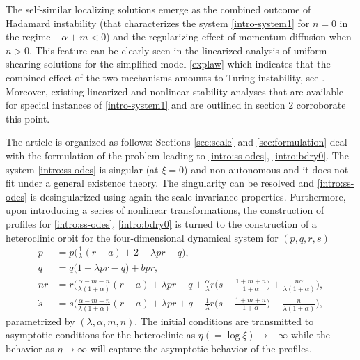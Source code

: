\documentclass[usletter,11pt]{article}
\theoremstyle{remark}
\begin{document}
The self-similar localizing solutions emerge as the combined outcome of Hadamard instability (that characterizes the system \eqref{intro-system1} for $n=0$ in the regime
$-\alpha + m < 0$) and the regularizing effect of momentum diffusion when $n > 0$.
This feature can be clearly seen in the linearized analysis of uniform shearing solutions for the simplified model \eqref{explaw} which indicates that the
combined effect of the two mechanisms amounts to Turing instability, see \cite{KOT14}. Moreover, existing linearized and nonlinear stability analyses that are available 
for special instances of \eqref{intro-system1} and are outlined in section 2 corroborate this point.  


The article is organized as follows: 
Sections \ref{sec:scale} and  \ref{sec:formulation} deal with the formulation of the problem leading to \eqref{intro:ss-odes}, \eqref{intro:bdry0}.
The system \eqref{intro:ss-odes} is singular (at $\xi=0$) and non-autonomous and it does not fit under a general existence theory.
The singularity can be resolved and \eqref{intro:ss-odes} is desingularized using again the scale-invariance properties. 
Furthermore, upon introducing a series of nonlinear transformations,  the construction of profiles for \eqref{intro:ss-odes}, \eqref{intro:bdry0} is turned to the
construction of a heteroclinic orbit for the four-dimensional dynamical system for $(p,q,r,s)$ 
\begin{equation}\label{intro:slow}\tag{S}
 \begin{aligned}
 \dot{p} &=p\Big(\frac{1}{\lambda}(r-a) + 2- \lambda p r -q\Big), \\
 \dot{q} &=q\Big(1 -\lambda p r -q\Big) + b p r,\\
 n\dot{r} &=r\Big(\frac{\alpha-m-n}{\lambda(1+\alpha)}(r-a) + \lambda pr + q +\frac{\alpha}{\lambda}r\big(s- \frac{1+m+n}{1+\alpha}\big) + \frac{n\alpha}{\lambda(1+\alpha)}\Big),\\
 \dot{s} &=s\Big(\frac{\alpha-m-n}{\lambda(1+\alpha)}(r-a) + \lambda pr + q - \frac{1}{\lambda}r\big(s- \frac{1+m+n}{1+\alpha}\big) - \frac{n}{\lambda(1+\alpha)}\Big),
 \end{aligned}
\end{equation}
parametrized by $(\lambda,\alpha,m,n)$. The initial conditions are transmitted to asymptotic conditions for the heteroclinic
as $ \eta(=\log\xi) \to -\infty$ while the behavior as $\eta \to \infty$ will capture the asymptotic behavior of the profiles.
\end{document}
